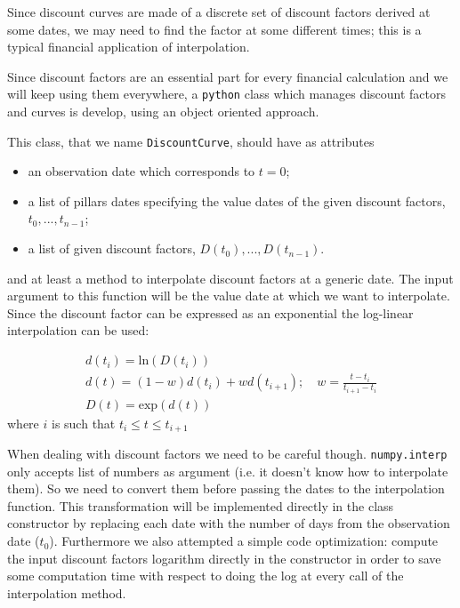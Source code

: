 Since discount curves are made of a discrete set of discount factors derived at some dates, we may need to find the factor at some different times; this is a typical financial application of interpolation.

\begin{finmarkets}
Since discount factors are an essential part for every financial calculation and we will keep using them everywhere, a \texttt{python} class which manages discount factors and curves is develop, using an object oriented approach.

This class, that we name \texttt{DiscountCurve}, should have as attributes
\begin{itemize}
	\tightlist
    \item an observation date which corresponds to $t=0$;
	\item a list of pillars dates specifying the value dates of the given discount factors, $t_0,...,t_{n-1}$;
	\item a list of given discount factors, $D(t_0),...,D(t_{n-1})$.
\end{itemize}

and at least a method to interpolate discount factors at a generic date. The input argument to this function will be the value date at which we want to interpolate. Since the discount factor can be expressed as an exponential the log-linear interpolation can be used:

\begin{equation}
	\begin{gathered}
		d(t_i)=\mathrm{ln}(D(t_i))\\
		d(t) = (1-w)d(t_i) + wd(t_{i+1});\quad w=\frac{t-t_i}{t_{i+1}-t_i}\\
		D(t) = \mathrm{exp}(d(t))
	\end{gathered}
\end{equation}
where $i$ is such that $t_i \le t \le t_{i+1}$

When dealing with discount factors we need to be careful though. \texttt{numpy.interp} only accepts list of numbers as argument (i.e. it doesn't know how to interpolate them). So we need to convert them before passing the dates to the interpolation function. This transformation will be implemented directly in the class constructor by replacing each date with the number of days from the observation date ($t_0$).
Furthermore we also attempted a simple code optimization: compute the input discount factors logarithm directly in the constructor in order to save some computation time with respect to doing the log at every call of the interpolation method. 
\end{finmarkets}

